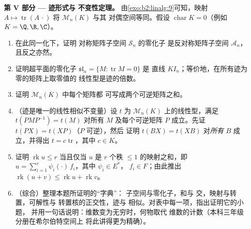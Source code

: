 \begin{problem}
\medskip
\noindent\textbf{第 V 部分 --- 迹形式与
不变性定理。} 由\cref{exo:b2:linalg:9}可知，映射 $A \mapsto
\operatorname{tr}(A\,\cdot)$ 将 $\mathcal{M}_n(K)$ 与其
        对偶空间等同。假设 $\operatorname{char} K = 0$（例如 $K = \Q, \R,
\C$）。
\begin{enumerate}[resume]
  \item 在此同一化下，证明
        对称矩阵子空间 $\mathcal{S}_n$ 的零化子
        是反对称矩阵子空间 $\mathcal{A}_n$，
        且反之亦然。
  \item 证明超平面的零化子
        $\mathfrak{sl}_n = \{M : \operatorname{tr} M = 0\}$ 是
        直线 $K I_n$；等价地，在所有迹为零的矩阵上取零值的
        线性型是迹的倍数。
  \item 证明 $\mathcal{M}_n(K)$ 中每个矩阵都
        可写成两个可逆矩阵之和。
  \item （迹是唯一的线性相似不变量）设
        $t$ 为 $\mathcal{M}_n(K)$ 上的线性型，满足
        $t(PMP^{-1}) = t(M)$ 对所有 $M$ 及每个可逆矩阵
        $P$ 成立。先证 $t(PX) = t(XP)$（$P$ 可逆），然后
        证明 $t(BX) = t(XB)$ 对\emph{所有} $B$ 成立，并得出 $t = c
        \operatorname{tr}$，其中 $c \in K$。
  \item 证明 $\operatorname{rk} u \leq r$ 当且仅当 $u$
        是 $r$ 个秩 $\leq 1$ 的映射之和，即 $u =
        \sum_{i=1}^{r} \psi_i(\cdot)\,f_i$，其中 $\psi_i \in E^*$，
        $f_i \in F$；由此推出 $\operatorname{rk}(u + v) \leq
        \operatorname{rk} u + \operatorname{rk} v$。
  \item （综合）整理本题所证明的“字典”：
        子空间与零化子，和与
        交，映射与转置，可解性与
        转置核的正交性，迹与
        相似。对表中每一项，指出证明它的小题，
        并用一句话说明：维数变为无穷时，何物取代
        维数的计数（本科三年级分册在希尔伯特空间上
        将此讲得更为精确）。
\end{enumerate}
\end{problem}
